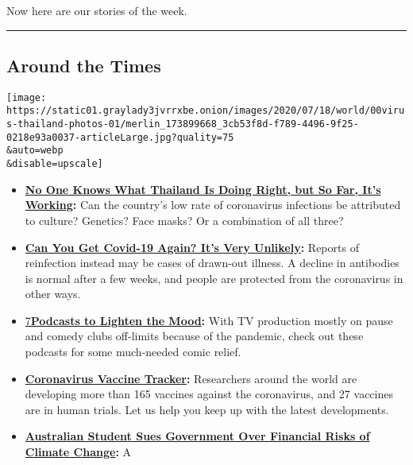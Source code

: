 Now here are our stories of the week.

\begin{center}\rule{0.5\linewidth}{\linethickness}\end{center}

\hypertarget{around-the-times}{%
\subsection{Around the Times}\label{around-the-times}}

\texttt{[image: https://static01.graylady3jvrrxbe.onion/images/2020/07/18/world/00virus-thailand-photos-01/merlin\_173899668\_3cb53f8d-f789-4496-9f25-0218e93a0037-articleLarge.jpg?quality=75\\\&auto=webp\\\&disable=upscale]}

\begin{itemize}
\item
  \textbf{\href{https://www.nytimes3xbfgragh.onion/2020/07/16/world/asia/coronavirus-thailand-photos.html}{No
  One Knows What Thailand Is Doing Right, but So Far, It's Working}:}
  Can the country's low rate of coronavirus infections be attributed to
  culture? Genetics? Face masks? Or a combination of all three?
\item
  \textbf{\href{https://www.nytimes3xbfgragh.onion/2020/07/22/health/covid-antibodies-herd-immunity.html}{Can
  You Get Covid-19 Again? It's Very Unlikely}:} Reports of reinfection
  instead may be cases of drawn-out illness. A decline in antibodies is
  normal after a few weeks, and people are protected from the
  coronavirus in other ways.
\item
  \href{https://www.nytimes3xbfgragh.onion/2020/07/22/arts/comedy-funny-podcasts.html}{7}\textbf{\href{https://www.nytimes3xbfgragh.onion/2020/07/22/arts/comedy-funny-podcasts.html}{Podcasts
  to Lighten the Mood}:} With TV production mostly on pause and comedy
  clubs off-limits because of the pandemic, check out these podcasts for
  some much-needed comic relief.
\item
  \textbf{\href{https://www.nytimes3xbfgragh.onion/interactive/2020/science/coronavirus-vaccine-tracker.html}{Coronavirus
  Vaccine Tracker}:} Researchers around the world are developing more
  than 165 vaccines against the coronavirus, and 27 vaccines are in
  human trials. Let us help you keep up with the latest developments.
\item
  \textbf{\href{https://www.nytimes3xbfgragh.onion/2020/07/23/world/australia/lawsuit-climate-change-bonds.html}{Australian
  Student Sues Government Over Financial Risks of Climate Change}:} A

\end{itemize}
